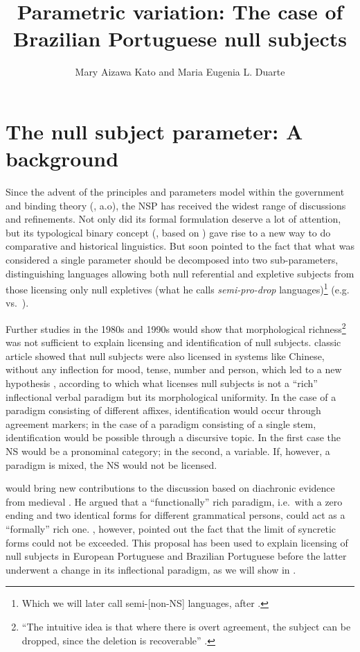 \documentclass[output=paper]{langsci/langscibook}
\author{Mary Aizawa Kato\affiliation{Universidade Estadual de Campinas} and
Maria Eugenia L. Duarte\affiliation{Universidade Federal do Rio de Janeiro}}
\title{Parametric variation: The case of Brazilian Portuguese null subjects}
\begin{document}
\glsresetall
\maketitle

\section{The null subject parameter: A background}

Since the advent of the principles and parameters model within the government
and binding theory (\citealt{Chomsky1981,Rizzi:1982}, a.o), the \gls{NSP} has
received the widest range of discussions and refinements.  Not only did its
formal formulation deserve a lot of attention, but its typological binary
concept (\citealt{Chomsky1981}, based on \citealt{Taraldsen1978}) gave rise to
a new way to do comparative and historical linguistics.  But
\citet[144]{Rizzi:1982} soon pointed to the fact that what was considered a
single parameter should be decomposed into two sub-parameters, distinguishing
languages allowing both null referential and expletive subjects from those
licensing only null expletives (what he calls \emph{semi-pro-drop}
languages)\footnote{Which we will later call semi-[non-NS] languages, after
\citet{Biberauer2010}.} (e.g.\  vs.\ ).

Further studies in the 1980s and 1990s would show that morphological
richness\footnote{“The intuitive idea is that where there is overt agreement,
the subject can be dropped, since the deletion is recoverable”
\parencite[241]{Chomsky1981}.} was not sufficient to explain licensing and
identification of null subjects.  classic article showed
that null subjects were also licensed in systems like Chinese, without any
inflection for mood, tense, number and person, which led to a new hypothesis
\parencite{JaeggliSafir1989}, according to which what licenses null subjects is
not a “rich” inflectional verbal paradigm but its morphological uniformity.  In
the case of a paradigm consisting of different affixes, identification would
occur through agreement markers; in the case of a paradigm consisting of a
single stem, identification would be possible through a discursive topic. In
the first case the NS would be a pronominal category; in the second, a
variable. If, however, a paradigm is mixed, the NS would not be licensed.

\citet{Roberts1993} would bring new contributions to the discussion based on
diachronic evidence from medieval . He argued that a “functionally”
rich paradigm, i.e.\ with a zero ending and two identical forms for different
grammatical persons, could act as a “formally” rich one.
\citeauthor{Roberts1993}, however, pointed out the fact that the limit of
syncretic forms could not be exceeded. This proposal has been used to explain
licensing of null subjects in European Portuguese and Brazilian Portuguese
before the latter underwent a change in its inflectional paradigm, as we will
show in .
\end{document}

